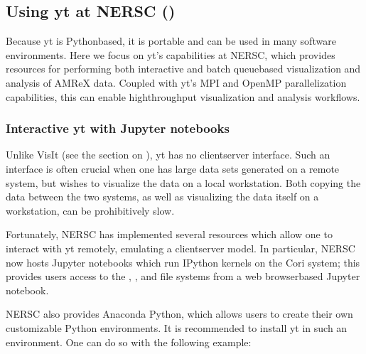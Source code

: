 \documentclass[letterpaper,10pt,english]{sphinxmanual}
\begin{document}
\subsection{Using yt at NERSC ()}
\label{\detokenize{Visualization:using-yt-at-nersc-under-development}}
\sphinxAtStartPar
Because yt is Python\sphinxhyphen{}based, it is portable and can be used in many software
environments. Here we focus on yt’s capabilities at NERSC, which provides
resources for performing both interactive and batch queue\sphinxhyphen{}based visualization
and analysis of AMReX data. Coupled with yt’s MPI and OpenMP parallelization
capabilities, this can enable high\sphinxhyphen{}throughput visualization and analysis
workflows.


\subsubsection{Interactive yt with Jupyter notebooks}
\label{\detokenize{Visualization:interactive-yt-with-jupyter-notebooks}}
\sphinxAtStartPar
Unlike VisIt (see the section on {\hyperref[\detokenize{Visualization:sec-visit}]{}}), yt has no client\sphinxhyphen{}server
interface. Such an interface is often crucial when one has large data sets
generated on a remote system, but wishes to visualize the data on a local
workstation. Both copying the data between the two systems, as well as
visualizing the data itself on a workstation, can be prohibitively slow.

\sphinxAtStartPar
Fortunately, NERSC has implemented several resources which allow one to
interact with yt remotely, emulating a client\sphinxhyphen{}server model. In particular,
NERSC now hosts Jupyter notebooks which run IPython kernels on the Cori system;
this provides users access to the , , and 
file systems from a web browser\sphinxhyphen{}based Jupyter notebook.  

\sphinxAtStartPar
NERSC also provides Anaconda Python, which allows users to create their own
customizable Python environments. It is recommended to install yt in such an
environment. One can do so with the following example:

\begin{sphinxVerbatim}[commandchars=\\\{\}]
 
\end{sphinxVerbatim}
\end{document}
